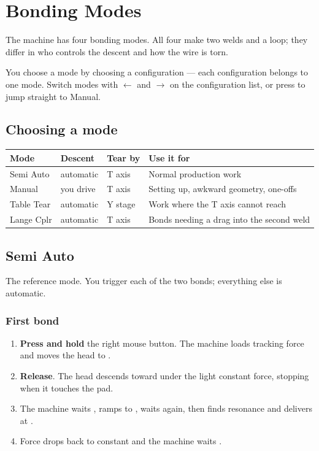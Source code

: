 \chapter{Bonding Modes}
\label{ch:modes}

The machine has four bonding modes. All four make two welds and a loop; they
differ in who controls the descent and how the wire is torn.

You choose a mode by choosing a configuration --- each configuration belongs to
one mode. Switch modes with $\leftarrow$ and $\rightarrow$ on the configuration
list, or press  to jump straight to Manual.

\section{Choosing a mode}

\begin{center}\small
\begin{tabular}{@{}L{24mm}L{24mm}L{24mm}L{44mm}@{}}
\toprule
\textbf{Mode} & \textbf{Descent} & \textbf{Tear by} & \textbf{Use it for} \\
\midrule
Semi Auto  & automatic & T axis & Normal production work \\
Manual     & you drive & T axis & Setting up, awkward geometry, one-offs \\
Table Tear & automatic & Y stage & Work where the T axis cannot reach \\
Lange Cplr & automatic & T axis & Bonds needing a drag into the second weld \\
\bottomrule
\end{tabular}
\end{center}

\section{Semi Auto}

The reference mode. You trigger each of the two bonds; everything else is
automatic.

\subsection*{First bond}

\begin{enumerate}[leftmargin=*]
\item \textbf{Press and hold} the right mouse button. The machine loads
  tracking force and moves the head to .
\item \textbf{Release}. The head descends toward  under
  the light constant force, stopping when it touches the pad.
\item The machine waits , ramps to ,
  waits again, then finds resonance and delivers  at
  .
\item Force drops back to constant and the machine waits .
\end{enumerate}

